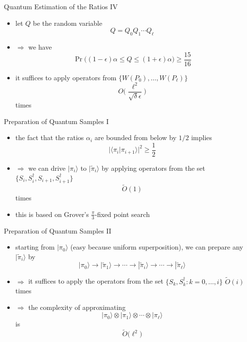 \documentclass[slideColor]{prosper}
\renewcommand{\>}{\rangle}
\newcommand{\<}{\langle}
\begin{document}

\begin{slide}{Quantum Estimation of the Ratios IV}
\begin{itemize}
\item let $Q$ be the random variable 
\[
Q=Q_0 Q_1 \cdots Q_\ell
\]

\item $\Rightarrow$ we have
\[
\Pr\Big( (1-\epsilon)\alpha \le Q \le (1+\epsilon)\alpha \Big) \ge \frac{15}{16}
\]

\item it suffices to apply operators from $\{W(P_0),\ldots,W(P_\ell)\}$
\[
O\Big(
\frac{\ell^2}{\sqrt{\delta}\epsilon}
\Big)
\]
times
\end{itemize}
\end{slide}


\begin{slide}{Preparation of Quantum Samples I}
\begin{itemize}
\item the fact that the ratios $\alpha_i$ are bounded from below by $1/2$ implies 
\[
|\<\pi_i|\pi_{i+1}\>|^2 \ge \frac{1}{2}
\]

\medskip
\item $\Rightarrow$ we can drive $|\pi_i\>$ to $|\tilde{\pi}_i\>$ by applying operators from the set $\{S_i,S_i^\dagger,S_{i+1},S_{i+1}^\dagger\}$
\[
\tilde{O}(1)
\] 
times

\medskip
\item this is based on Grover's $\frac{\pi}{3}$-fixed point search

\end{itemize}
\end{slide}


\begin{slide}{Preparation of Quantum Samples II}
\begin{itemize}
\item starting from $|\pi_0\>$ (easy because uniform superposition), we can prepare any $|\tilde{\pi}_i\>$ by
\[
|\pi_0\> \rightarrow |\tilde{\pi}_1\> \rightarrow \cdots \rightarrow |\tilde{\pi}_i\> \rightarrow \cdots \rightarrow |\tilde{\pi}_\ell\>
\]

\medskip
\item $\Rightarrow$ it suffices to apply the operators from the set $\{S_k,S_k^\dagger : k = 0,\ldots,i\}$ $\tilde{O}(i)$ times

\medskip
\item $\Rightarrow$ the complexity of approximating
\[
|\pi_0\> \otimes |\pi_1\> \otimes \cdots \otimes |\pi_\ell\>
\]
is 
\[
\tilde{O}\Big(
\ell^2
\Big)
\]
\end{itemize}
\end{slide}
\end{document}
